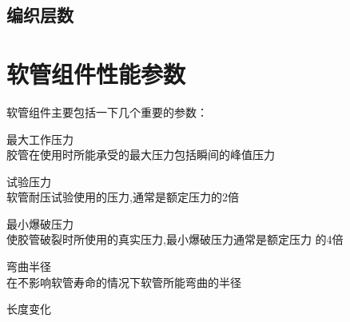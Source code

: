 \subsection{编织层数}






\section{软管组件性能参数}

软管组件主要包括一下几个重要的参数：
\begin{compactenum}
	\item 最大工作压力\\
	胶管在使用时所能承受的最大压力包括瞬间的峰值压力
	\item 试验压力\\
	软管耐压试验使用的压力,通常是额定压力的2倍
	\item 最小爆破压力\\
	使胶管破裂时所使用的真实压力,最小爆破压力通常是额定压力 的4倍
	\item 弯曲半径\\
	在不影响软管寿命的情况下软管所能弯曲的半径
	\item 长度变化\\
\end{compactenum}





